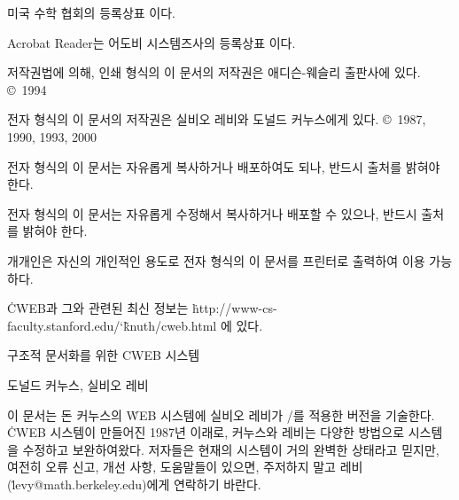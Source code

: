 \noindent
{} 미국 수학 협회의 등록상표 이다.

\noindent
Acrobat Reader는 어도비 시스템즈사의 등록상표 이다.

\bigskip\noindent
저작권법에 의해, 인쇄 형식의 이 문서의 저작권은 애디슨-웨슬리 출판사에
있다.  \copyright\ 1994 

\smallskip\noindent
전자 형식의 이 문서의 저작권은 실비오 레비와 도널드 커누스에게
있다. \copyright\ 1987, 1990, 1993, 2000 

\bigskip\noindent
전자 형식의 이 문서는 자유롭게 복사하거나 배포하여도 되나, 반드시
출처를 밝혀야 한다.

\smallskip\noindent
전자 형식의 이 문서는 자유롭게 수정해서 복사하거나 배포할 수 있으나, 반드시
출처를 밝혀야 한다.

\smallskip\noindent
개개인은 자신의 개인적인 용도로 전자 형식의 이 문서를 프린터로
출력하여 이용 가능하다.

\smallskip\noindent
\.{CWEB}과 그와 관련된 최신 정보는 
\.{http://www-cs-faculty.stanford.edu/\char`\~knuth/cweb.html}
에 있다.

 \titletrue\eject

\baselineskip=15pt

\titletrue
\centerline{\titlefont 구조적 문서화를 위한 {\ttitlefont CWEB} 시스템}

\centerline{도널드 커누스, 실비오 레비}

\noindent
이 문서는 돈 커누스의 \.{WEB} 시스템에 실비오 레비가 \CEE/를
적용한 버전을 기술한다. \.{CWEB} 시스템이 만들어진 1987년 이래로, 
커누스와 레비는 다양한 방법으로 시스템을 수정하고 보완하여왔다. 
저자들은 현재의 시스템이 거의 완벽한 상태라고 믿지만, 
여전히 오류 신고, 개선 사항, 도움말들이 있으면,
주저하지 말고 레비(\.{levy@math.berkeley.edu})에게 연락하기 바란다.

